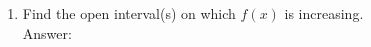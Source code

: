 \documentclass[12pt]{article}
\begin{document}
\begin{enumerate}
\begin{enumerate}
\item Find the open interval(s) on which $f(x)$ is increasing.\\

\hfill Answer:\underline{\hspace{2in}}
\end{enumerate}
\end{enumerate}
\end{document}
